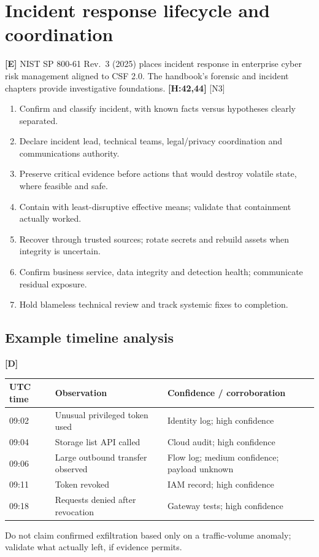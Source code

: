 \documentclass[10pt,letterpaper,oneside]{article}
\newcommand{\handbookref}[1]{\textsf{\color{accent}\textbf{[H:#1]}}}
\newcommand{\modernext}{\textsf{\color{muted}\textbf{[E]}}}
\newcommand{\designed}{\textsf{\color{accent}\textbf{[D]}}}
\begin{document}
\section{Incident response lifecycle and coordination}\modernext{}
NIST SP 800-61 Rev.~3 (2025) places incident response in enterprise cyber risk management aligned to CSF 2.0. The handbook's forensic and incident chapters provide investigative foundations. \handbookref{42,44} [N3]
\begin{enumerate}
\item Confirm and classify incident, with known facts versus hypotheses clearly separated.
\item Declare incident lead, technical teams, legal/privacy coordination and communications authority.
\item Preserve critical evidence before actions that would destroy volatile state, where feasible and safe.
\item Contain with least-disruptive effective means; validate that containment actually worked.
\item Recover through trusted sources; rotate secrets and rebuild assets when integrity is uncertain.
\item Confirm business service, data integrity and detection health; communicate residual exposure.
\item Hold blameless technical review and track systemic fixes to completion.
\end{enumerate}
\subsection{Example timeline analysis}\designed{}
\par\medskip\noindent\begin{tabularx}{\textwidth}{@{}p{}X p{}@{}}\toprule
UTC time & Observation & Confidence / corroboration \\ \midrule
09:02 & Unusual privileged token used & Identity log; high confidence\\
09:04 & Storage list API called & Cloud audit; high confidence\\
09:06 & Large outbound transfer observed & Flow log; medium confidence; payload unknown\\
09:11 & Token revoked & IAM record; high confidence\\
09:18 & Requests denied after revocation & Gateway tests; high confidence\\
\bottomrule\end{tabularx}\par\medskip
Do not claim confirmed exfiltration based only on a traffic-volume anomaly; validate what actually left, if evidence permits.
\end{document}
